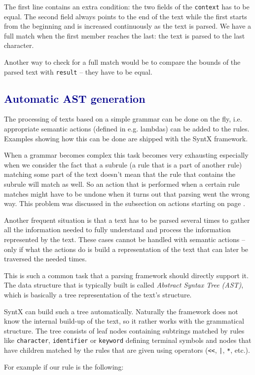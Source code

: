 \documentclass[12pt]{article}
\newcommand{\usubsec}[2]{\subsection*{\textcolor{darkblue}{#1}}\label{subsec:#2}\addcontentsline{toc}{subsection}{#1}}
\begin{document}
The first line contains an extra condition: the two fields of the \texttt{context} has to be equal. The second
field always points to the end of the text while the first starts from the beginning and is increased
continuously as the text is parsed. We have a full match when the first member reaches the last: the text is
parsed to the last character.

Another way to check for a full match would be to compare the bounds of the parsed text with \texttt{result}
-- they have to be equal.

\usubsec{Automatic AST generation}{ast}
The processing of texts based on a simple grammar can be done on the fly, i.e. appropriate semantic actions
(defined in e.g. lambdas) can be added to the rules. Examples showing how this can be done are shipped with
the SyntX framework.

When a grammar becomes complex this task becomes very exhausting especially when we consider the fact that a
subrule (a rule that is a part of another rule) matching some part of the text doesn't mean that the rule that
contains the subrule will match as well. So an action that is performed when a certain rule matches might have
to be undone when it turns out that parsing went the wrong way. This problem was discussed in the subsection
on actions starting on page \pageref{subsec:actions}.

Another frequent situation is that a text has to be parsed several times to gather all the information needed
to fully understand and process the information represented by the text. These cases cannot be handled with
semantic actions -- only if what the actions do is build a representation of the text that can later be
traversed the needed times.

This is such a common task that a parsing framework should directly support it. The data structure that is
typically built is called \emph{Abstract Syntax Tree (AST)}, which is basically a tree representation of
the text's structure.

SyntX can build such a tree automatically. Naturally the framework does not know the internal build-up of the
text, so it rather works with the grammatical structure. The tree consists of leaf nodes containing subtrings
matched by rules like \texttt{character}, \texttt{identifier} or \texttt{keyword} defining terminal symbols
and nodes that have children matched by the rules that are given using operators (\texttt{<<}, \texttt{|},
\texttt{*}, etc.).

For example if our rule is the following:
\end{document}
